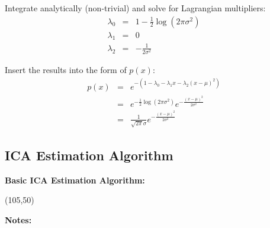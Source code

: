   Integrate analytically (non-trivial) and solve for Lagrangian multipliers:
  \begin{eqnarray*}
    \lambda_0 &=& 1 - \frac{1}{2} \log(2 \pi \sigma^2 ) \\
    \lambda_1 &=& 0 \\
    \lambda_2 &=& - \frac{1}{2 \sigma^2}  
  \end{eqnarray*}
   
  Insert the results into the form of $p(x)$:
  \begin{eqnarray*}
    p(x) &=& e^{-(1 - \lambda_0 - \lambda_1 x - \lambda_2 (x-\mu)^2)} \\
         &=& e^{-\frac{1}{2} \log(2 \pi \sigma^2)} e^{-\frac{(x-\mu)^2}{2 \sigma^2}} \\
         &=& \frac{1}{\sqrt{2 \pi} \sigma} e^{- \frac{(x-\mu)^2}{2 \sigma^2}}
  \end{eqnarray*}
  
\subsection{ICA Estimation Algorithm}\label{sec:ica_algorithm}

 \textbf{Basic ICA Estimation Algorithm:}

  \begin{centernss}
    \begin{struktogramm}(105,50)
      \untilend
    \end{struktogramm}
  \end{centernss}
  \vspace{0.3cm}
  
 \textbf {Notes:}\\

